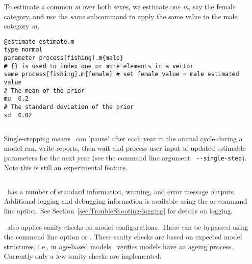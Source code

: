 To estimate a common \textit{m} over both sexes, we estimate one \textit{m}, say the female category, and use the \textit{same} subcommand to apply the same value to the male category \textit{m},

{\small{\begin{verbatim}
@estimate estimate.m
type normal
parameter process[fishing].m{male}
# {} is used to index one or more elements in a vector
same process[fishing].m{female} # set female value = male estimated value
# The mean of the prior
mu  0.2
# The standard deviation of the prior
sd  0.02
\end{verbatim}}}


\subsection{\label{sec:SingleStepping}}



Single-stepping means \CNAME\ can 'pause' after each year in the annual cycle during a model run, write reports, then wait and process user input of updated estimable parameters for the next year (see the command line argument \texttt{ -{}-single-step}). Note this is still an experimental feature.


\subsection{}\label{sec:LogandVerify}

\CNAME\ has a  number of standard information, warning, and error message outputs. Additional logging and debugging information is available using the  or  command line option. See Section~\ref{sec:TroubleShooting-logging} for details on logging. 

\CNAME\ also applies sanity checks on model configurations. These can be bypassed using the command line option  or . These sanity checks are based on expected model structures, i.e., in age-based models \CNAME\ verifies models have an ageing process. Currently only a few sanity checks are implemented.

